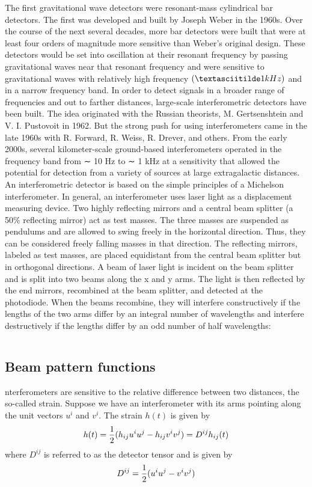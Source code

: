\documentclass[binding=0.6cm, LaM]{sapthesis}
\begin{document}
The first gravitational wave detectors were resonant-mass cylindrical bar detectors. The first was developed and built by Joseph Weber in the 1960s. Over the course of the next several decades, more bar detectors were built that were at least four orders of magnitude more sensitive than Weber’s original design. These detectors would be set into oscillation at their resonant frequency by passing gravitational waves near that resonant frequency and were sensitive to gravitational waves with relatively high frequency $(\textasciitilde 1 kHz)$ and in a narrow frequency band. In order to detect signals in a broader range of frequencies and out to farther distances, large-scale interferometric detectors have been built. The idea originated with the Russian theorists, M. Gertsenshtein and V. I. Pustovoit in 1962. But the strong push for using interferometers came in the late 1960s with R. Forward, R. Weiss, R. Drever, and others. From the early 2000s, several kilometer-scale ground-based interferometers operated in the frequency band from ∼ 10 Hz to ∼ 1 kHz at a sensitivity that allowed the potential for detection from a variety of sources at large extragalactic distances.
An interferometric detector is based on the simple principles of a Michelson interferometer. In general, an interferometer uses laser light as a displacement measuring device. Two highly reflecting mirrors and a central beam splitter (a 50\% reflecting mirror) act as test masses. The three masses are suspended as pendulums and are allowed to swing freely in the horizontal direction. Thus, they can be considered freely falling masses in that direction. The reflecting mirrors,  labeled as test masses, are placed equidistant from the central beam splitter but in orthogonal directions.
A beam of laser light is incident on the beam splitter and is split into two beams along the x and y arms. The light is then reflected by the end mirrors, recombined at the beam splitter, and detected at the photodiode. When the beams recombine, they will interfere constructively if the lengths of the two arms differ by an integral number of wavelengths and interfere destructively if the lengths differ by an odd number of half wavelengths:

\begin{equation}

\end{equation}
\subsection{Beam pattern functions}
nterferometers are sensitive to the relative difference between two distances, the so-called strain. Suppose we have an interferometer with its arms pointing along the unit vectors $u^i$ and $v^i$. The strain $h(t)$ is given by
\begin{equation}
h(t) = {1 \over 2} (h_{ij}u^iu^j - h_{ij}v^iv^j) = D^{ij}h_{ij}(t)
\end{equation}
where $D^{ij}$ is referred to as the detector tensor and is given by
\begin{equation}
D^{ij} = {1\over 2} (u^iu^j -v^iv^j)
\end{equation}
\end{document}

